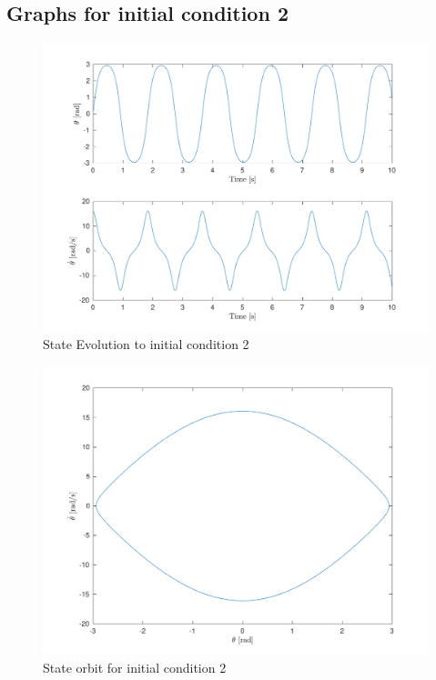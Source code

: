 \documentclass[10pt]{article}
\begin{document}
\subsection{Graphs for initial condition 2}
    \begin{figure}[ht]
     \includegraphics[scale=0.7]{lab1/figs/section3_x0_2_state_evolution.pdf}
     \caption{State Evolution to initial condition 2}
     \label{figure:x_0_2_state_evolution}
    \end{figure}

    \begin{figure}[ht]
     \includegraphics[scale=0.7]{lab1/figs/section3_x0_2_state_orbit.pdf}
     \caption{State orbit for initial condition 2}
     \label{figure:x_0_1_state_orbit}
    \end{figure}
\end{document}
